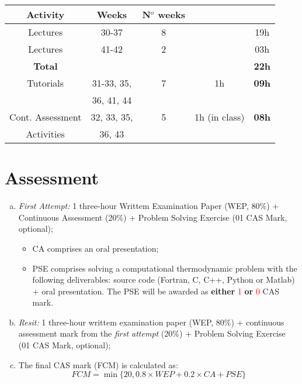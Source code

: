 \documentclass[11pt,oneside,a4paper]{article}
\begin{document}
\begin{center}
\begin{tabular}{||c c c c c ||}
\hline\hline
{\bf Activity} & {\bf Weeks}  & {\bf N$^{o}$ weeks} &                &       \\
\hline\hline
Lectures       &  30-37       &  8                 &   &  19h    \\
Lectures       &  41-42       &  2                 &   &  03h     \\
{\bf Total}    &              &                    &                &  {\bf 22h}\\
\hline
Tutorials      & 31-33, 35,  &   7               &  1h            &  {\bf 09h}  \\
               & 36, 41, 44   &                   &                &            \\
\hline
Cont. Assessment     & 32, 33, 35,  &  5                &  1h (in class) &   {\bf 08h}  \\
Activities           & 36, 43       &                   &                &      \\ 
\hline\hline
\end{tabular}
\end{center}

\section{Assessment}
\begin{enumerate}[(a)]
\item {\it First Attempt:} 1 three-hour Writtem Examination Paper (WEP, 80$\%$) + Continuous Assessment (20$\%$) + Problem Solving Exercise (01 CAS Mark, optional);
\begin{itemize}
\item CA comprises an oral presentation;
\item PSE comprises solving a computational thermodynamic problem with the following deliverables: source code (Fortran, C, C++, Python or Matlab) + oral presentation. The PSE will be awarded as {\bf either} \textcolor{red}{1} {\bf or} \textcolor{red}{0} CAS mark.
\end{itemize}
\item {\it Resit:} 1 three-hour writtem examination paper (WEP, 80$\%$) + continuous assessment mark from the {\it first attempt} (20$\%$) + Problem Solving Exercise (01 CAS Mark, optional);
\item The final CAS mark (FCM) is calculated as:
\begin{displaymath}
FCM = \min\{20, 0.8 \times WEP + 0.2 \times CA + PSE\}
\end{displaymath}
\end{enumerate}
\end{document}
